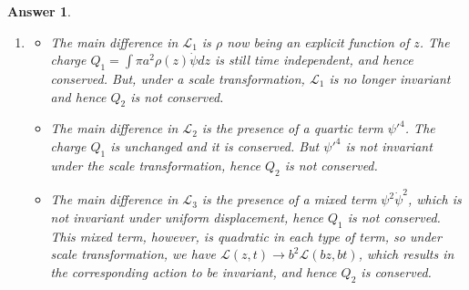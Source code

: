 \documentclass[a4paper]{article}
\newtheorem{ans}{Answer}[section]
\theoremstyle{new}
\begin{document}
\begin{ans}
\begin{enumerate}[label=(\alph*)]
\begin{align}
\end{align}
Both are time independent, and are thus conserved.
\item 
\begin{itemize}
    \item The main difference in $\mathcal{L}_1$ is $\rho$ now being an explicit function of $z$. The charge $Q_1=\int\pi a^2\rho(z)\dot{\psi}dz$ is still time independent, and hence conserved. But, under a scale transformation, $\mathcal{L}_1$ is no longer invariant and hence $Q_2$ is not conserved.
    \item The main difference in $\mathcal{L}_2$ is the presence of a quartic term $\psi'^4$. The charge $Q_1$ is unchanged and it is conserved. But $\psi'^4$ is not invariant under the scale transformation, hence $Q_2$ is not conserved.
    \item The main difference in $\mathcal{L}_3$ is the presence of a mixed term $\psi^2\dot{\psi}^2$, which is not invariant under uniform displacement, hence $Q_1$ is not conserved. This mixed term, however, is quadratic in each type of term, so  under scale transformation, we have $\mathcal{L}(z,t)\rightarrow b^2\mathcal{L}(bz,bt)$, which results in the corresponding action to be invariant, and hence $Q_2$ is conserved.
\end{itemize}
\end{enumerate}
\end{ans}
\end{document}
